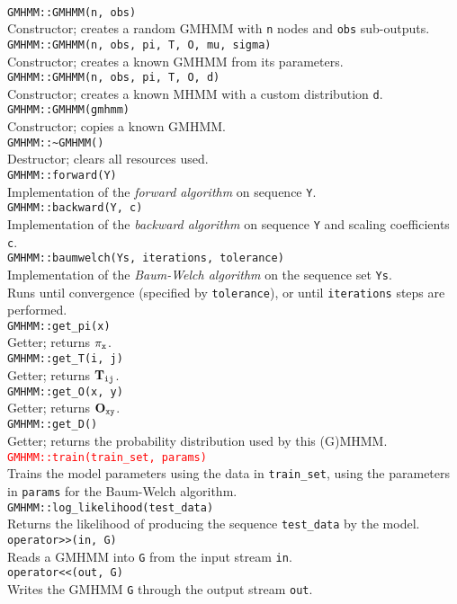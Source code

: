 \documentclass[12pt,openany]{article}
\newcommand{\fundef}[1]{\\\indent\indent\texttt{#1}\\}
\begin{document}
	\hfill\vspace*{-10pt}\fundef{GMHMM::GMHMM(n, obs)}
	Constructor; creates a random GMHMM with {\tt n} nodes and {\tt obs} sub-outputs.
	\fundef{GMHMM::GMHMM(n, obs, pi, T, O, mu, sigma)}
	Constructor; creates a known GMHMM from its parameters.
	\fundef{GMHMM::GMHMM(n, obs, pi, T, O, d)}
	Constructor; creates a known MHMM with a custom distribution {\tt d}.
	\fundef{GMHMM::GMHMM(gmhmm)}
	Constructor; copies a known GMHMM.
	\fundef{GMHMM::\textasciitilde GMHMM()}
	Destructor; clears all resources used.
	\fundef{GMHMM::forward(Y)}
	Implementation of the \emph{forward algorithm} on sequence {\tt Y}.
	\fundef{GMHMM::backward(Y, c)}
	Implementation of the \emph{backward algorithm} on sequence {\tt Y} and scaling coefficients {\tt c}.
	\fundef{GMHMM::baumwelch(Ys, iterations, tolerance)}
	Implementation of the \emph{Baum-Welch algorithm} on the sequence set {\tt Ys}.\\
	Runs until convergence (specified by {\tt tolerance}), or until {\tt iterations} steps are performed.
	\fundef{GMHMM::get\_pi(x)}
	Getter; returns $\pi_{\tt x}$.
	\fundef{GMHMM::get\_T(i, j)}
	Getter; returns ${\bf T}_{\tt ij}$.
	\fundef{GMHMM::get\_O(x, y)}
	Getter; returns ${\bf O}_{\tt xy}$.
	\fundef{GMHMM::get\_D()}
	Getter; returns the probability distribution used by this (G)MHMM.
	\textcolor{red}{\fundef{GMHMM::train(train\_set, params)}}
	Trains the model parameters using the data in {\tt train\_set}, using the parameters in {\tt params} for the Baum-Welch algorithm.
	\fundef{GMHMM::log\_likelihood(test\_data)}
	Returns the likelihood of producing the sequence {\tt test\_data} by the model.
	\fundef{operator>\/>(in, G)}
	Reads a GMHMM into {\tt G} from the input stream {\tt in}.
	\fundef{operator<\/<(out, G)}
	Writes the GMHMM {\tt G} through the output stream {\tt out}.
	
\end{document}
